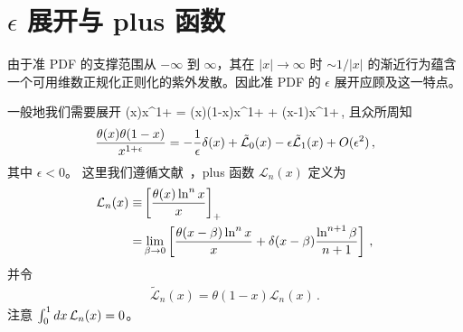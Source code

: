 \section{$\epsilon$ 展开与 plus 函数}
\label{sec:ep}

由于准 PDF 的支撑范围从 $-\infty$ 到 $\infty$，其在 $|x|\to\infty$ 时 $\sim1/|x|$ 的渐近行为蕴含一个可用维数正规化正则化的紫外发散。因此准 PDF 的 $\epsilon$ 展开应顾及这一特点。

一般地我们需要展开
\beq
	{\theta(x)\over x^{1+\epsilon}} = {\theta(x)\theta(1-x)\over x^{1+\epsilon}} + {\theta(x-1)\over x^{1+\epsilon}}\,,
\eeq
且众所周知
\begin{align} \label{eq:ident}
{\theta(x)\theta(1-x)\over x^{1+\epsilon}} = - {1\over\epsilon}\delta(x)+
\tilde{\mathcal{L}}_0(x) - \epsilon \tilde{\mathcal{L}}_1(x)+ O(\epsilon^2)\,,
\end{align}
其中 $\epsilon<0$。
这里我们遵循文献~\cite{Ligeti:2008ac}，plus 函数 $\mathcal{L}_n(x)$ 定义为
\begin{align} \label{eq:plus1}
	\mathcal{L}_n(x)\equiv &\left[ {\theta(x)\ln^nx\over x}\right]_+
   \\
	= &\lim_{\beta\to0} \left[{\theta(x-\beta)\ln^n x\over x} + \delta(x-\beta) {\ln^{n+1}\beta \over n+1}\right]
 \,, \nonumber
\end{align}
并令
\begin{align}
  \tilde{\mathcal{L}}_n(x) = \theta(1-x) \mathcal{L}_n(x) \,.
\end{align}
注意 $\int_0^1 dx \, {\cal L}_n(x) =0$。

